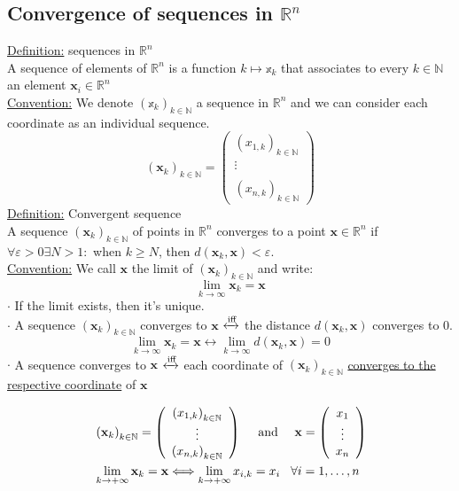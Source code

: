 \documentclass[a4paper,11pt]{article}
\newcommand{\icol}[1]{%
  \left(\begin{smallmatrix}#1\end{smallmatrix}\right)%
}
\renewcommand{\iff}{
  \xleftrightarrow{\text{iff}}
}
\begin{document}
\subsection{Convergence of sequences in $\mathbb{R}^n$}
\underline{Definition:} sequences in $\mathbb{R}^n$ \\
A sequence of elements of $\mathbb{R}^n$ is a function $ k \mapsto \mathbb{x}_k $ that associates to every $k \in \mathbb{N} $ an element $\mathbf{x}_i \in \mathbb{R}^n$ \\
\underline{Convention:} We denote $\left(\mathbb{x}_k\right)_{k \in \mathbb{N}} $ a sequence in $\mathbb{R}^n$ and we can consider each coordinate as an individual sequence.
$$ \left(\mathbf{x}_k\right)_{k \in \mathbb{N}} = \icol{ \left( x_{1,k}\right)_{k \in \mathbb{N}} \\ \vdots \\ \\ \left(x_{n,k}\right)_{k \in \mathbb{N}} } $$
\underline{Definition:} Convergent sequence \\
A sequence $\left(\mathbf{x}_k\right)_{k \in \mathbb{N}}$ of points in $\mathbb{R}^n$ converges to a point $\mathbf{x} \in \mathbb{R}^n$ if $\forall \varepsilon > 0 \exists N > 1 : $ when $ k \geq N $, then $d(\mathbf{x}_k, \mathbf{x}) < \varepsilon $. \\
\underline{Convention:} We call $\mathbf{x} $ the limit of $\left(\mathbf{x}_k\right)_{k \in \mathbb{N}}$ and write:
$$ \lim_{k \to \infty} \mathbf{x}_k = \mathbf{x} $$
$\cdot$ If the limit exists, then it's unique. \\
$\cdot$ A sequence $\left(\mathbf{x}_k\right)_{k \in \mathbb{N}}$ converges to $\mathbf{x}$ $\iff$ the distance $d(\mathbf{x}_k,\mathbf{x})$ converges to 0.
$$ \lim_{k \to \infty} \mathbf{x}_k = \mathbf{x} \longleftrightarrow \lim_{k \to \infty} d(\mathbf{x}_k,\mathbf{x}) = 0 $$
$\cdot$ A sequence converges to $\mathbf{x}$ $\iff$ each coordinate of $\left(\mathbf{x}_k\right)_{k \in \mathbb{N}}$ \underline{converges to the respective coordinate} of $\mathbf{x}$ 

$$
\begin{aligned}
&\left(\mathbf{x}_k\right)_{k \in \mathbb{N}}=\left(\begin{array}{c}
\left(x_{1, k}\right)_{k \in \mathbb{N}} \\
\vdots \\
\left(x_{n, k}\right)_{k \in \mathbb{N}}
\end{array}\right) \quad \text { and } \quad \mathbf{x}=\left(\begin{array}{c}
x_1 \\
\vdots \\
x_n
\end{array}\right)\\
&\lim _{k \rightarrow+\infty} \mathbf{x}_k=\mathbf{x} \Longleftrightarrow \lim _{k \rightarrow+\infty} x_{i, k}=x_i \hspace{3mm} \forall i=1, \ldots, n
\end{aligned}
$$
\end{document}
